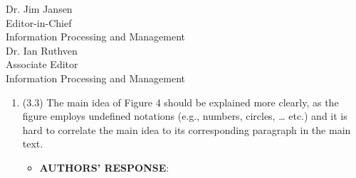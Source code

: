 \documentclass[11pt]{letter} %
\begin{document}
\begin{letter}{Dr. Jim Jansen \\
			Editor-in-Chief  \\
			Information Processing and Management\\
			Dr. Ian Ruthven \\
			Associate Editor \\
			Information Processing and Management}
\begin{enumerate}
\begin{itemize}
\begin{itemize}
				Equation 9:
				\begin{equation}
				\small
				    e_{s} = \min \limits_{A_{s}}\left(\frac{A_{sj}^{l}}{v_{s}-v_{s-1}-1}\right) \nonumber
				\end{equation}
				
				Equation 10:
				\begin{equation}
				\small
				    \tilde{a}_{ij}^{l} = a_{ij}^{l}\prod_{q=0}^{s}g_{qj} + e_{s}g_{sj}' \nonumber
				\end{equation}

				``i'' is the index in Equation 10.
				To eliminating ambiguity, we combine Equation 9 and Equation 10 as follows (Equation 9, page 12):
				\begin{equation}
				\small
					\tilde{a}_{ij}^{l} = a_{ij}^{l}\prod_{q=0}^{s}g_{qj} + \min \limits_{A_{s}}\left(\frac{A_{sj}^{l}}{v_{s}-v_{s-1}-1}\right)g_{sj}'
					\nonumber
				\end{equation}
				\item[-] We have re-written Equation 12 (Equation $11$ in revised manuscript) according to the Reviewer's suggestion.
				The details are as follows (Equation 11 and line 235-237, page 15):
				
				``
				To determine whether two sentences, 
				$p$ and $q$, are similar, we define a boolean function as:
				\begin{equation}\label{eq:s}
				\small
					sim(p,q) = 
					\begin{cases}
						   1 &\mbox{if $o(p,q) > n\text{ OR }o(p,q) > \frac{1}{2}\cdot l$}\\
						   0 &\mbox{others}
				   \end{cases}
				   \nonumber
				\end{equation}
				where $o(p,q)$ denotes the length of 
				the longest common substring (LCS) between $p$ and $q$, 
				$l$ is the minimum of the lengths of $p$ and $q$, and $n$ is a constant. 
				$sim(p,q)=1$ means the two sentence are similar.
				''
				\end{itemize}
             
                \hspace*{0.6cm} 
                We have made correction in Section 3.1 and 3.2 
				according to Reviewer's comments and above explanation.
			\end{itemize}
			\item
			(3.3) The main idea of Figure 4 should be explained more clearly, as the figure employs undefined notations (e.g., numbers, circles, … etc.) and it is hard to correlate the main idea to its corresponding paragraph in the main text.
			\begin{itemize}
				\item[] \textbf{AUTHORS' RESPONSE}: 


\end{itemize}
\end{enumerate}
\end{letter}
\end{document}

